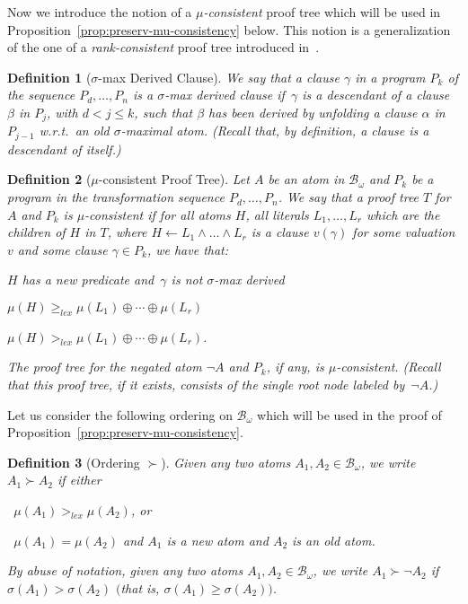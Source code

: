 \documentclass[english]{tlp}
\newtheorem{definition}{Definition} \newtheorem{example}{Example}       \newtheorem{remark}{Remark}
\renewcommand{\mathit}{\displaystyle}
\begin{document}
\medskip
\noindent Now we introduce the notion of a {\em $\mu$-consistent}
proof tree which will be used in
Proposition~\ref{prop:preserv-mu-consistency} below. This notion is
a generalization of the one of a {\em rank-consistent} proof tree
introduced in~\cite{TaS84}.

\begin{definition}[$\sigma$-max Derived   Clause]
We say that a clause $\gamma$ in a program $P_k$ of the sequence
$P_d,\ldots,P_n$ is a $\sigma${\em -max derived} clause if~$\gamma$ is a
descendant of a clause $\beta$ in $P_{j}$, with $d\!<\! j\!\leq\! k$, such that
$\beta$ has been derived by unfolding a clause $\alpha$ in $P_{j-1}$
w.r.t.~an old $\sigma$-maximal atom. {\rm{(}}Recall that, by definition, a clause is
a descendant of itself.{\rm{)}}
\end{definition}

\begin{definition}[\(\mu\)-consistent Proof Tree] \label{def:mu-consistency}
Let \( A \) be an atom in \(\mathcal{B}_{\omega} \) and $P_k$ be a
program in the transformation sequence \( P_{d},\ldots,P_{n} \). We
say that a proof tree \( T \) for \( A \) and \( P_{k} \) is
\mbox{\emph{\(\mu\)-consistent}} if for all atoms \( H\), all literals \(
L_{1},\ldots ,L_{r} \) which are the children of \( H \) in \( T \),
where $H\leftarrow L_{1}\wedge\ldots \wedge L_{r}$ is a clause
$v(\gamma)$ for some valuation $v$ and some clause $\gamma\in P_k$,  we
have that\/{\rm{:}}

 $H$ has a new predicate and~$\gamma$ is not
$\sigma$-max derived 

\noindent 
{} \( \mu (H)\geq_{\mathit{lex}}\mu
(L_{1})\oplus \cdots \oplus \mu (L_{r}) \) 

\noindent 
{} \( \mu
(H)>_{\mathit{lex}}\mu (L_{1})\oplus \cdots \oplus \mu (L_{r}) \).

The proof tree for the negated atom $\neg A$ and $P_k$, if any, is $\mu$-consistent.
{\rm{(}}Recall that this proof tree, if it exists, consists of the single root node labeled by~$\neg A$.{\rm{)}}

\end{definition}

Let us consider the following ordering on $\mathcal
B_{\omega}$ which will be used in the proof of
Proposition~\ref{prop:preserv-mu-consistency}.

\begin{definition}[Ordering $\succ$] \label{def:curly-greater}
Given any two atoms 
$A_1,A_2\in
\mathcal B_{\omega}$, we write $A_1 \succ A_2$ if either 


~$\mu(A_1)
>_{\mathit{lex}} \mu(A_2)$, or 


~$\mu(A_1) = \mu(A_2)$
and $A_1$ is a new atom and
$A_2$ is an old atom. 

\noindent
By abuse of notation, 
given any two atoms $A_1,A_2\in \mathcal B_{\omega}$, 
we write $A_1 \succ \neg A_2$ if  $\sigma(A_1)\! >\! \sigma (A_2)$ 
$($that is, $\sigma(A_1)\! \geq\! \sigma (A_2))$.
\end{definition}
\end{document}
